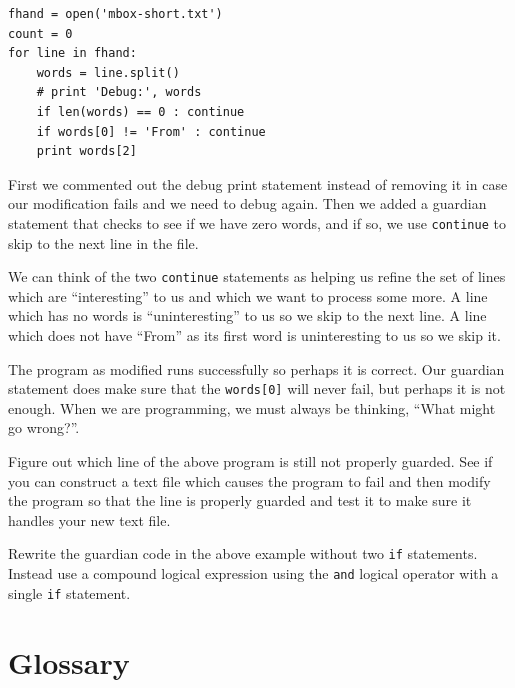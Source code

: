 \documentclass[10pt]{book}
\begin{document}
\begin{enumerate}
\beforeverb
\begin{verbatim}
fhand = open('mbox-short.txt')
count = 0
for line in fhand:
    words = line.split()
    # print 'Debug:', words
    if len(words) == 0 : continue
    if words[0] != 'From' : continue
    print words[2]
\end{verbatim}
\afterverb
%
First we commented out the debug print statement instead of removing it 
in case our modification fails and we need to debug again.  Then we added
a guardian statement that checks to see if we have zero words, and if so, 
we use {\tt continue} to skip to the next line in the file.

We can think of the two {\tt continue} statements as helping us refine
the set of lines which are ``interesting'' to us and which we want 
to process some more.  A line which has no words is ``uninteresting'' to 
us so we skip to the next line.  A line which does not have ``From''
as its first word is uninteresting to us so we skip it.

The program as modified runs successfully so perhaps it is correct.  Our
guardian statement does make sure that the {\tt words[0]} will never fail, 
but perhaps it is not enough.  When we are programming, we must always be 
thinking, ``What might go wrong?''.

\begin{ex}
Figure out which line of the above program is still not properly guarded.
See if you can construct a text file which causes the program to fail
and then modify the program so that the line is properly guarded and 
test it to make sure it handles your new text file.
\end{ex}

\begin{ex}
Rewrite the guardian code in the above example without two
{\tt if} statements.  Instead use a compound logical expression using the
{\tt and} logical operator with a single {\tt if} statement.
\end{ex}


\end{enumerate}



\section{Glossary}
\end{document}
